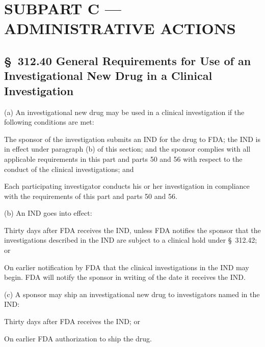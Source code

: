 \clearpage

\section{SUBPART C --- ADMINISTRATIVE ACTIONS}

\subsection{\S~312.40 General Requirements for Use of an Investigational New Drug in a Clinical Investigation}

(a) An investigational new drug may be used in a clinical investigation if the following conditions are met:

\begin{description}[leftmargin=0.5cm,style=sameline]
\item[(1)] The sponsor of the investigation submits an IND for the drug to FDA; the IND is in effect under paragraph (b) of this section; and the sponsor complies with all applicable requirements in this part and parts 50 and 56 with respect to the conduct of the clinical investigations; and
\item[(2)] Each participating investigator conducts his or her investigation in compliance with the requirements of this part and parts 50 and 56.
\end{description}

(b) An IND goes into effect:

\begin{description}[leftmargin=0.5cm,style=sameline]
\item[(1)] Thirty days after FDA receives the IND, unless FDA notifies the sponsor that the investigations described in the IND are subject to a clinical hold under \S~312.42; or
\item[(2)] On earlier notification by FDA that the clinical investigations in the IND may begin. FDA will notify the sponsor in writing of the date it receives the IND.
\end{description}

(c) A sponsor may ship an investigational new drug to investigators named in the IND:

\begin{description}[leftmargin=0.5cm,style=sameline]
\item[(1)] Thirty days after FDA receives the IND; or
\item[(2)] On earlier FDA authorization to ship the drug.
\end{description}

